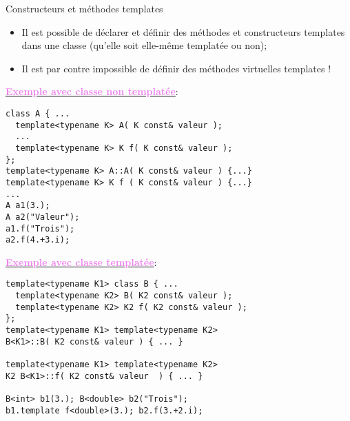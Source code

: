 \documentclass[compress,10pt,aspectratio=169]{beamer}
\begin{document}
\begin{frame}[fragile]{Constructeurs et méthodes templates}
  \scriptsize

  \begin{itemize}
\item Il est possible de déclarer et définir des méthodes et constructeurs 
      templates dans une classe (qu'elle soit elle-même templatée ou non);
\item Il est par contre impossible de définir des méthodes virtuelles templates !
  \end{itemize}

\begin{multicols}{2}
\underline{\textcolor{violet}{\bf Exemple avec classe non templatée}}:
\begin{verbatim}
class A { ...
  template<typename K> A( K const& valeur );
  ... 
  template<typename K> K f( K const& valeur );
};
template<typename K> A::A( K const& valeur ) {...}
template<typename K> K f ( K const& valeur ) {...}
...
A a1(3.);
A a2("Valeur");
a1.f("Trois");
a2.f(4.+3.i);
\end{verbatim}
\columnbreak
\underline{\textcolor{violet}{\bf Exemple avec classe templatée}}:
\begin{verbatim}
template<typename K1> class B { ...
  template<typename K2> B( K2 const& valeur );
  template<typename K2> K2 f( K2 const& valeur );
};    
template<typename K1> template<typename K2>
B<K1>::B( K2 const& valeur ) { ... }

template<typename K1> template<typename K2> 
K2 B<K1>::f( K2 const& valeur  ) { ... }

B<int> b1(3.); B<double> b2("Trois");
b1.template f<double>(3.); b2.f(3.+2.i);
\end{verbatim}
\end{multicols}
\end{frame}
\end{document}
